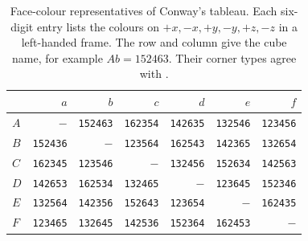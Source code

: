 \documentclass[11pt]{article}
\begin{document}
\begin{table}[htbp]
\centering
\begin{tabular}{lrrrrrr}\toprule
 & $a$ & $b$ & $c$ & $d$ & $e$ & $f$ \\\midrule
$A$ & $-$ & \texttt{152463} & \texttt{162354} & \texttt{142635} & \texttt{132546} & \texttt{123456} \\
$B$ & \texttt{152436} & $-$ & \texttt{123564} & \texttt{162543} & \texttt{142365} & \texttt{132654} \\
$C$ & \texttt{162345} & \texttt{123546} & $-$ & \texttt{132456} & \texttt{152634} & \texttt{142563} \\
$D$ & \texttt{142653} & \texttt{162534} & \texttt{132465} & $-$ & \texttt{123645} & \texttt{152346} \\
$E$ & \texttt{132564} & \texttt{142356} & \texttt{152643} & \texttt{123654} & $-$ & \texttt{162435} \\
$F$ & \texttt{123465} & \texttt{132645} & \texttt{142536} & \texttt{152364} & \texttt{162453} & $-$ \\
\bottomrule\end{tabular}
\caption{Face-colour representatives of Conway's tableau. Each six-digit
entry lists the colours on $+x,-x,+y,-y,+z,-z$ in a left-handed frame.
The row and column give the cube name, for example $Ab=152463$.
Their corner types agree with \cite[Table~3]{JR}.}
\label{tab:cubes}
\end{table}
\end{document}
